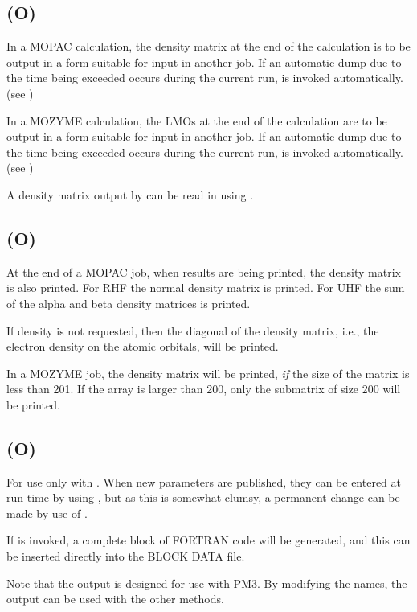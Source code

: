 \subsection*{ (O)}
In a MOPAC calculation, the density matrix at the end of the calculation  is to
be output  in  a  form  suitable  for input in another job.  If an
automatic dump due to the time being exceeded occurs during the  current
run,     is invoked automatically.  (see )

In a MOZYME calculation, the LMOs at the end of the calculation are to  be
output  in  a  form  suitable  for input in another job.  If an
automatic dump due to the time being exceeded occurs during the  current
run,     is invoked automatically.   (see )

A density matrix output by  can be read in using .


\subsection*{ (O)}
At the end of a MOPAC job, when results are being printed, the density matrix
is  also  printed.  For RHF the normal density matrix is printed. For UHF the
sum of the alpha and beta density matrices is printed.

If density is not  requested,  then  the  diagonal  of  the  density matrix,
i.e.,  the  electron  density  on  the  atomic orbitals, will be printed.

In a MOZYME job, the density matrix will be printed, {\em if} the size of the
matrix is less than 201. If the array is larger than 200, only the  submatrix
of size 200 will be printed.

\subsection*{ (O)}
For use only with .   When  new  parameters  are
published, they  can  be  entered  at  run-time  by  using ,
but as this is somewhat clumsy, a permanent change can be made by use of
.

If  is  invoked,  a  complete  block  of  FORTRAN  code  will  be
generated, and this can be inserted directly into the BLOCK DATA file.

Note that the output is designed for use with PM3.  By modifying the names, the
output can be used with the other methods.

